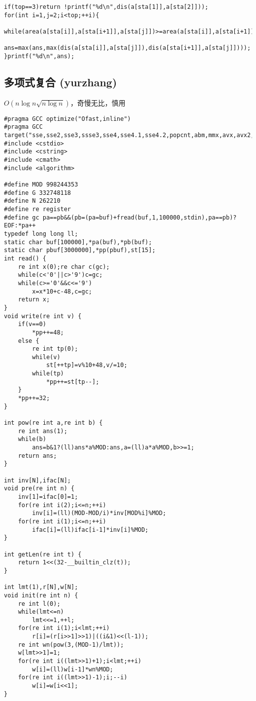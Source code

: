 \documentclass[12pt]{ctexart}
\begin{document}
\begin{lstlisting}
if(top==3)return !printf("%d\n",dis(a[sta[1]],a[sta[2]]));
for(int i=1,j=2;i<top;++i){
	while(area(a[sta[i]],a[sta[i+1]],a[sta[j]])>=area(a[sta[i]],a[sta[i+1]],a[sta[j%top+1]]))j=j%top+1;
	ans=max(ans,max(dis(a[sta[i]],a[sta[j]]),dis(a[sta[i+1]],a[sta[j]])));
}printf("%d\n",ans);
\end{lstlisting}

\subsection{多项式复合 (yurzhang)}

$O(n\log n\sqrt{n\log n})$，奇慢无比，慎用

\begin{lstlisting}
#pragma GCC optimize("Ofast,inline")
#pragma GCC target("sse,sse2,sse3,ssse3,sse4,sse4.1,sse4.2,popcnt,abm,mmx,avx,avx2,tune=native")
#include <cstdio>
#include <cstring>
#include <cmath>
#include <algorithm>

#define MOD 998244353
#define G 332748118
#define N 262210
#define re register
#define gc pa==pb&&(pb=(pa=buf)+fread(buf,1,100000,stdin),pa==pb)?EOF:*pa++
typedef long long ll;
static char buf[100000],*pa(buf),*pb(buf);
static char pbuf[3000000],*pp(pbuf),st[15];
int read() {
    re int x(0);re char c(gc);
    while(c<'0'||c>'9')c=gc;
    while(c>='0'&&c<='9')
        x=x*10+c-48,c=gc;
    return x;
}
void write(re int v) {
    if(v==0)
        *pp++=48;
    else {
        re int tp(0);
        while(v)
            st[++tp]=v%10+48,v/=10;
        while(tp)
            *pp++=st[tp--];
    }
    *pp++=32;
}

int pow(re int a,re int b) {
    re int ans(1);
    while(b)
        ans=b&1?(ll)ans*a%MOD:ans,a=(ll)a*a%MOD,b>>=1;
    return ans;
}

int inv[N],ifac[N];
void pre(re int n) {
    inv[1]=ifac[0]=1;
    for(re int i(2);i<=n;++i)
        inv[i]=(ll)(MOD-MOD/i)*inv[MOD%i]%MOD;
    for(re int i(1);i<=n;++i)
        ifac[i]=(ll)ifac[i-1]*inv[i]%MOD;
}

int getLen(re int t) {
	return 1<<(32-__builtin_clz(t));
}

int lmt(1),r[N],w[N];
void init(re int n) {
	re int l(0);
	while(lmt<=n)
		lmt<<=1,++l;
	for(re int i(1);i<lmt;++i)
		r[i]=(r[i>>1]>>1)|((i&1)<<(l-1));
	re int wn(pow(3,(MOD-1)/lmt));
	w[lmt>>1]=1;
	for(re int i((lmt>>1)+1);i<lmt;++i)
		w[i]=(ll)w[i-1]*wn%MOD;
	for(re int i((lmt>>1)-1);i;--i)
		w[i]=w[i<<1];
}


\end{lstlisting}
\end{document}
